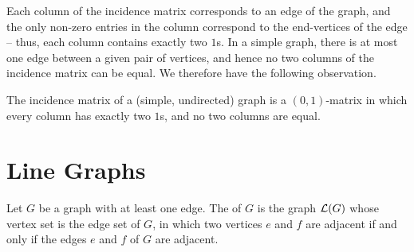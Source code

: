 Each column of the incidence matrix corresponds to an edge of the graph, and the only non-zero entries in the column correspond to the end-vertices of the edge -- thus, each column contains exactly two $1$s. In a simple graph, there is at most one edge between a given pair of vertices, and hence no two columns of the incidence matrix can be equal. We therefore have the following observation.

\begin{Observation}
The incidence matrix of a (simple, undirected) graph is a $(0, 1)$-matrix in which every column has exactly two $1$s, and no two columns are equal.
\end{Observation}


\section{Line Graphs}\label{sec:LineGraphs}

Let $G$ be a graph with at least one edge. The  of $G$ is the graph $\operatorname{\mathcal L}(G)$ whose vertex set is the edge set of $G$, in which two vertices $e$ and $f$ are adjacent if and only if the edges $e$ and $f$ of $G$ are adjacent.

